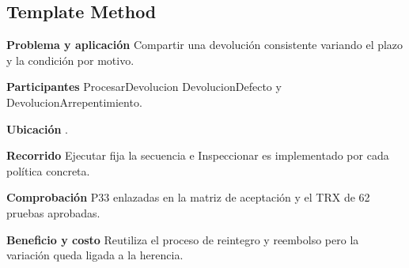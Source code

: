 \noindent\begin{minipage}{\linewidth}
\subsection{Template Method}
\textbf{Problema y aplicación} Compartir una devolución consistente variando el plazo y la condición por motivo.

\textbf{Participantes} ProcesarDevolucion DevolucionDefecto y DevolucionArrepentimiento.

\textbf{Ubicación} \href{https://github.com/Alan77-bot/LogiMarket360Alan/blob/68bda51063441415524ede51bdf61649ee9b4973/LogiMarket.Application/Logistica/ProcesarDevolucion.cs#L15}{}.

\textbf{Recorrido} Ejecutar fija la secuencia e Inspeccionar es implementado por cada política concreta.


\textbf{Comprobación} P33 enlazadas en la matriz de aceptación y el TRX de 62 pruebas aprobadas.

\textbf{Beneficio y costo} Reutiliza el proceso de reintegro y reembolso pero la variación queda ligada a la herencia.

\end{minipage}\par\smallskip
